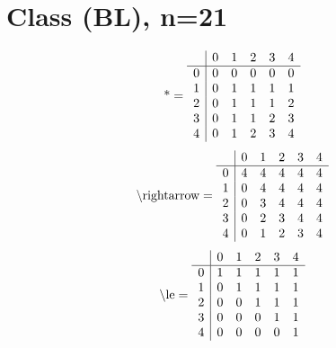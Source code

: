 \documentclass[11pt]{article}
\begin{document}
\section{Class (BL), n=21}
\[\text{*} = 
\begin{array}{r | r r r r r}
 & 0 & 1 & 2 & 3 & 4 \\ \hline
0 & 0 & 0 & 0 & 0 & 0 \\
1 & 0 & 1 & 1 & 1 & 1 \\
2 & 0 & 1 & 1 & 1 & 2 \\
3 & 0 & 1 & 1 & 2 & 3 \\
4 & 0 & 1 & 2 & 3 & 4 \\
\end{array}
\]
\[\text{\textbackslash rightarrow} = 
\begin{array}{r | r r r r r}
 & 0 & 1 & 2 & 3 & 4 \\ \hline
0 & 4 & 4 & 4 & 4 & 4 \\
1 & 0 & 4 & 4 & 4 & 4 \\
2 & 0 & 3 & 4 & 4 & 4 \\
3 & 0 & 2 & 3 & 4 & 4 \\
4 & 0 & 1 & 2 & 3 & 4 \\
\end{array}
\]
\[\text{\textbackslash le} = 
\begin{array}{r | r r r r r}
 & 0 & 1 & 2 & 3 & 4 \\ \hline
0 & 1 & 1 & 1 & 1 & 1 \\
1 & 0 & 1 & 1 & 1 & 1 \\
2 & 0 & 0 & 1 & 1 & 1 \\
3 & 0 & 0 & 0 & 1 & 1 \\
4 & 0 & 0 & 0 & 0 & 1 \\
\end{array}
\]
\end{document}

